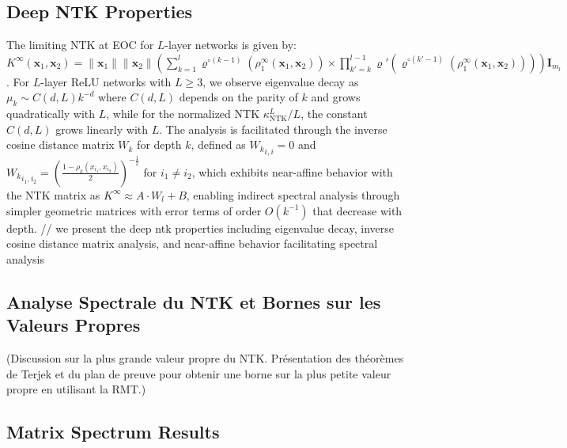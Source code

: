 \documentclass[a4paper]{article}
\begin{document}
\newpage























\subsection{Deep NTK Properties}

The limiting NTK at EOC for $L$-layer networks is given by: $K^{\infty}(\mathbf{x}_1, \mathbf{x}_2) = \|\mathbf{x}_1\| \|\mathbf{x}_2\| \left( \sum_{k=1}^l \varrho^{\circ (k-1)}\left(\rho_1^{\infty}(\mathbf{x}_1, \mathbf{x}_2)\right) \times \prod_{k'=k}^{l-1} \varrho'\left(\varrho^{\circ (k'-1)}\left(\rho_1^{\infty}(\mathbf{x}_1, \mathbf{x}_2)\right)\right) \right) \mathbf{I}_{m_l}$. For $L$-layer ReLU networks with $L \geq 3$, we observe eigenvalue decay as $\mu_k \sim C(d, L)k^{-d}$ where $C(d, L)$ depends on the parity of $k$ and grows quadratically with $L$, while for the normalized NTK $\kappa^L_{\text{NTK}}/L$, the constant $C(d, L)$ grows linearly with $L$. The analysis is facilitated through the inverse cosine distance matrix $W_k$ for depth $k$, defined as ${W_k}_{i,i} = 0$ and ${W_k}_{i_1,i_2} = \left( \frac{1 - \rho_k(x_{i_1},x_{i_2})}{2} \right)^{-\frac{1}{2}}$ for $i_1 \neq i_2$, which exhibits near-affine behavior with the NTK matrix as $K^{\infty} \approx A \cdot W_l + B$, enabling indirect spectral analysis through simpler geometric matrices with error terms of order $O(k^{-1})$ that decrease with depth. // we present the deep ntk properties including eigenvalue decay, inverse cosine distance matrix analysis, and near-affine behavior facilitating spectral analysis




\subsection{Analyse Spectrale du NTK et Bornes sur les Valeurs Propres}
(Discussion sur la plus grande valeur propre du NTK. Présentation des théorèmes de Terjek et du plan de preuve pour obtenir une borne sur la plus petite valeur propre en utilisant la RMT.)


\subsection{Matrix Spectrum Results}
\end{document}
